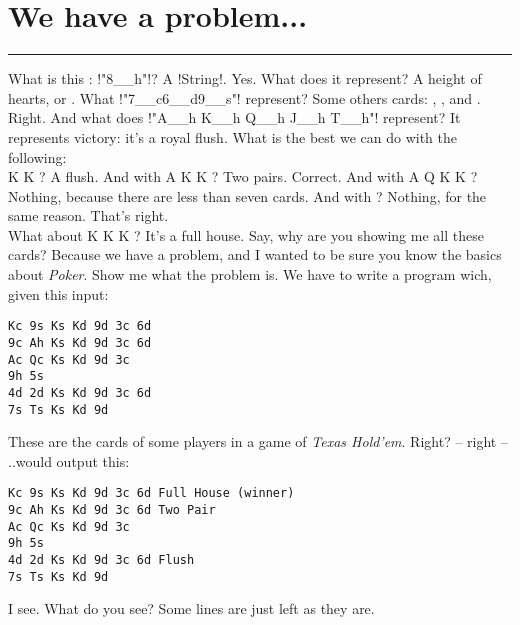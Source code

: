 \newpage
\section{We have a problem...} %
\vspace{10cm}
\hrule

\lhQ What is this : \il!"8__h"!?
\lhA A \il!String!.
\lhN Yes. What does it represent?
\lhA A height of hearts, or .
\lhN What \il!"7__c6__d9__s"! represent?
\lhA Some others cards: , , and .
\lhN Right. And what does \il!"A__h K__h Q__h J__h T__h"! represent?
\lhA It represents victory: it's a royal flush.
\lhN What is the best we can do with the following: \\
   \spades K \diamonds K   ?
\lhA A flush.
\lhN And with  \hearts A \spades K \diamonds K   ?
\lhA Two pairs.
\lhN Correct. And with \clubs A \clubs Q \spades K \diamonds K  ?
\lhA Nothing, because there are less than seven cards.
\lhN And with  ?
\lhA Nothing, for the same reason.
\lhN That's right. \\
What about \clubs K  \spades K \diamonds K    ?
\lhA It's a full house. Say, why are you showing me all these cards?
\lhN Because we have a problem, and I wanted to be sure you know the basics about \emph{Poker}.
\lhA Show me what the problem is.
\lhN We have to write a program wich, given this input:
\begin{verbatim}
Kc 9s Ks Kd 9d 3c 6d
9c Ah Ks Kd 9d 3c 6d
Ac Qc Ks Kd 9d 3c
9h 5s
4d 2d Ks Kd 9d 3c 6d
7s Ts Ks Kd 9d
\end{verbatim}
\hspace*{\fill} 
\lhA These are the cards of some players in a game of \emph{Texas Hold'em}. Right?
\lhN -- right -- ..would output this:
\begin{verbatim}
Kc 9s Ks Kd 9d 3c 6d Full House (winner)
9c Ah Ks Kd 9d 3c 6d Two Pair
Ac Qc Ks Kd 9d 3c 
9h 5s 
4d 2d Ks Kd 9d 3c 6d Flush
7s Ts Ks Kd 9d 
\end{verbatim}
\hspace*{\fill} 
\lhA I see. 
\lhN What do you see?
\lhA Some lines are just left as they are. \\
